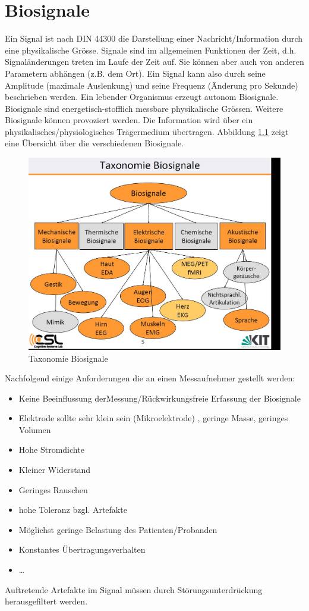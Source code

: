 \chapter{Biosignale}

Ein Signal ist nach DIN 44300 die Darstellung einer Nachricht/Information durch eine physikalische Grösse. Signale sind im allgemeinen Funktionen der Zeit, d.h. Signaländerungen treten im Laufe der Zeit auf. Sie können aber auch von anderen Parametern abhängen (z.B. dem Ort). Ein Signal kann also durch seine Amplitude (maximale Auslenkung) und seine Frequenz (Änderung pro Sekunde) beschrieben werden.
Ein lebender Organismus erzeugt autonom Biosignale. Biosignale sind energetisch-stofflich messbare physikalische Grössen. Weitere Biosignale können provoziert werden. Die Information wird über ein physikalisches/physiologisches Trägermedium übertragen. Abbildung \ref{fig:biosignale} zeigt eine Übersicht über die verschiedenen Biosignale.

\begin{figure}[h!]
\centering
\includegraphics[width=0.6\linewidth]{fig/biosignale}
\caption{Taxonomie Biosignale}
\label{fig:biosignale}
\end{figure}

Nachfolgend einige Anforderungen die an einen Messaufnehmer gestellt werden:
\begin{itemize}
	\item Keine Beeinflussung derMessung/Rückwirkungsfreie Erfassung der Biosignale
	\item Elektrode sollte sehr klein sein (Mikroelektrode) , geringe Masse, geringes Volumen
	\item Hohe Stromdichte
	\item Kleiner Widerstand
	\item Geringes Rauschen
	\item hohe Toleranz bzgl. Artefakte
	\item Möglichst geringe Belastung des Patienten/Probanden
	\item Konstantes Übertragungsverhalten
	\item \dots
\end{itemize}
Auftretende Artefakte im Signal müssen durch Störungsunterdrückung herausgefiltert werden.